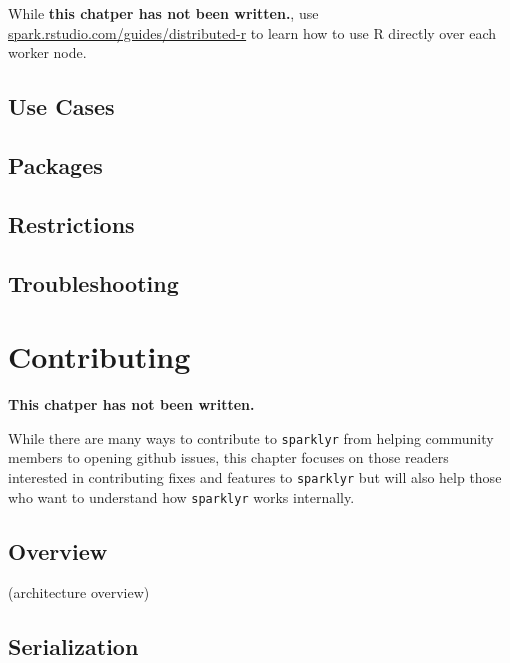\documentclass[]{book}
\theoremstyle{definition}
\theoremstyle{definition}
\theoremstyle{definition}
\theoremstyle{remark}
\begin{document}
While \textbf{this chatper has not been written.}, use
\href{http://spark.rstudio.com/guides/distributed-r/}{spark.rstudio.com/guides/distributed-r}
to learn how to use R directly over each worker node.

\hypertarget{use-cases}{%
\section{Use Cases}\label{use-cases}}

\hypertarget{packages}{%
\section{Packages}\label{packages}}

\hypertarget{restrictions}{%
\section{Restrictions}\label{restrictions}}

\hypertarget{troubleshooting-1}{%
\section{Troubleshooting}\label{troubleshooting-1}}

\hypertarget{contributing}{%
\chapter{Contributing}\label{contributing}}

\textbf{This chatper has not been written.}

While there are many ways to contribute to \texttt{sparklyr} from
helping community members to opening github issues, this chapter focuses
on those readers interested in contributing fixes and features to
\texttt{sparklyr} but will also help those who want to understand how
\texttt{sparklyr} works internally.

\hypertarget{overview-6}{%
\section{Overview}\label{overview-6}}

(architecture overview)

\hypertarget{serialization}{%
\section{Serialization}\label{serialization}}
\end{document}

